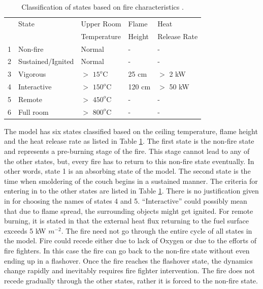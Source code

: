 \documentclass[12pt]{asme2ej}
\begin{document}
\begin{table}[!h]\centering
\caption{Classification of states based on fire characteristics \cite{Berlin1985}. \label{tbl:FireStateDef}}
\begin{tabular}{l l l l l}
\hline
& State	&	Upper Room  	&	Flame  	&	Heat 	\\
&			& Temperature   &		Height						&	Release Rate\\
\hline
1 & Non-fire 	&	Normal 	&	- 	&	-	\\
2 & Sustained/Ignited 	&	Normal 	&	- 	&	-	\\
3 & Vigorous 	&	$>$ $15^{o}$C 	&	25 cm 	&	$>$ 2 kW	\\
4 & Interactive 	&	$>$ $150^o$C 	&	120 cm 	&	$>$ 50 kW	\\
5 & Remote 	&	$>$ $450^{o}$C 	&	- 	&	-	\\
6 & Full room 	&	$>$ $800^o$C 	&	- 	&	-	\\
\hline
\end{tabular}
\end{table}

The model has six states classified based on the ceiling temperature, flame height and the heat release rate as listed in Table  \ref{tbl:FireStateDef}. The first state is the non-fire state and represents a pre-burning stage of the fire. This stage cannot lead to any of the other states, but, every fire has to return to this non-fire state eventually. In other words, state 1 is an absorbing state of the model. The second state is the time when smoldering of the couch begins in a sustained manner. The criteria for entering in to the other states are listed in Table \ref{tbl:FireStateDef}. There is no justification given in \cite{Berlin1985} for choosing the names of states 4 and 5. ``Interactive'' could possibly mean that due to flame spread, the surrounding objects might get ignited. For remote burning, it is stated in \cite{Berlin1985} that the external heat flux returning to the fuel surface exceeds 5 kW $m^{-2}$. The fire need not go through the entire cycle of all states in the model. Fire could recede either due to lack of Oxygen or due to the efforts of fire fighters. In this case the fire can go back to the non-fire state without even ending up in a flashover.  Once the fire reaches the flashover state, the dynamics change rapidly and inevitably requires fire fighter intervention. The fire does not recede gradually through the other states, rather it is forced to the non-fire state.
\end{document}
